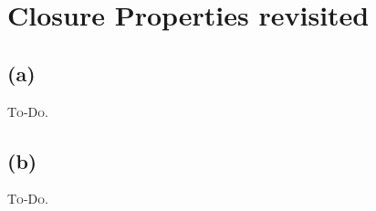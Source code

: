 


\setcounter{section}{3}

\section{Closure Properties revisited}

\subsection{(a)}

\textsc{To-Do.}

\subsection{(b)}

\textsc{To-Do.}


